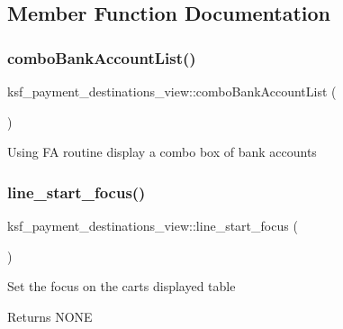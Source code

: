 \subsection{Member Function Documentation}
\hypertarget{classksf__payment__destinations__view_a9e5a6ab82c58d8f3943888a4755d6ac9}{}\label{classksf__payment__destinations__view_a9e5a6ab82c58d8f3943888a4755d6ac9} 
\subsubsection{\texorpdfstring{combo\+Bank\+Account\+List()}{comboBankAccountList()}}
{\footnotesize\ttfamily ksf\+\_\+payment\+\_\+destinations\+\_\+view\+::combo\+Bank\+Account\+List (\begin{DoxyParamCaption}{ }\end{DoxyParamCaption})}

Using FA routine display a combo box of bank accounts \hypertarget{classksf__payment__destinations__view_a5b78ad01dfa787f4445ec711ce929982}{}\label{classksf__payment__destinations__view_a5b78ad01dfa787f4445ec711ce929982} 
\subsubsection{\texorpdfstring{line\+\_\+start\+\_\+focus()}{line\_start\_focus()}}
{\footnotesize\ttfamily ksf\+\_\+payment\+\_\+destinations\+\_\+view\+::line\+\_\+start\+\_\+focus (\begin{DoxyParamCaption}{ }\end{DoxyParamCaption})}

Set the focus on the cart\textquotesingle{}s displayed table

\begin{DoxyReturn}{Returns}
N\+O\+NE 
\end{DoxyReturn}
\hypertarget{classksf__payment__destinations__view_a803d4b744228624d16222728b9062f74}{}\label{classksf__payment__destinations__view_a803d4b744228624d16222728b9062f74} 
